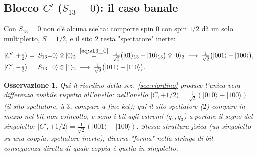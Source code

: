 \documentclass[11pt,a4paper]{article}
\newtheorem{osservazione}{Osservazione}
\begin{document}
\subsection{Blocco $C'$ ($S_{13}=0$): il caso banale}

Con $S_{13}=0$ non c'è alcuna scelta: comporre spin $0$ con spin $1/2$ dà un
solo multipletto, $S=1/2$, e il sito $2$ resta "spettatore" inerte:
\begin{align}
|C',{+}\tfrac12\rangle &= |S_{13}{=}0\rangle\otimes|0\rangle_2
\;\overset{\eqref{eq:s13_0}}{=}\; \tfrac1{\sqrt2}\big(|01\rangle_{13}-|10\rangle_{13}\big)\otimes|0\rangle_2
\;\longrightarrow\; \tfrac1{\sqrt2}\big(|001\rangle-|100\rangle\big), \label{eq:Cp12}\\
|C',{-}\tfrac12\rangle &= |S_{13}{=}0\rangle\otimes|1\rangle_2
\;\longrightarrow\; \tfrac1{\sqrt2}\big(|011\rangle-|110\rangle\big). \label{eq:Cm12}
\end{align}

\begin{osservazione}
Qui il riordino della sez.~\ref{sec:riordino} produce l'unica vera
differenza visibile rispetto all'anello: nell'anello $|C,+1/2\rangle=\tfrac1{\sqrt2}(|010\rangle-|100\rangle)$
(il sito spettatore, il $3$, compare \emph{a fine} ket); qui il sito
spettatore ($2$) compare \emph{in mezzo} nel bit non coinvolto, e sono i
bit agli \emph{estremi} ($q_1,q_3$) a portare il segno del singoletto:
$|C',+1/2\rangle=\tfrac1{\sqrt2}(|001\rangle-|100\rangle)$. Stessa struttura
fisica (un singoletto su una coppia, spettatore inerte), diversa
"forma" nella stringa di bit — conseguenza diretta di quale coppia è quella
in singoletto.
\end{osservazione}
\end{document}
